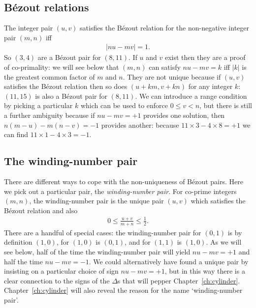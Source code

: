 \subsection{B\'ezout relations}
The integer pair $(u,v)$ satisfies the B\'ezout relation for the non-negative integer pair $(m,n)$ iff
\begin{align}
	|n  u-mv| = 1.
\end{align}
So $(3,4)$ are a B\'ezout pair for $(8,11)$. 
If $u$ and $v$ exist then they are a proof of co-primality: we will see below that $(m,n)$ can satisfy  $ n  u - m v= k$ iff $|k|$ is the greatest common factor of $m$ and $n$. They are not unique because if $(u,v)$ satisfies the B\'ezout relation then so does $(u+km,v+kn)$ for any integer $k$: $(11,15)$ is also a B\'ezout pair for $(8,11)$. We can introduce a range condition by picking a particular $k$ which can be used to enforce $0\leq v< n$, but there is still a further ambiguity because if
$n u- m v  =+1$ provides one solution, then $n(m-u)-m(n-v)=-1$ provides another: because $11\times3-4\times8 =+1$ we can find $11\times 1-4\times 3=-1$. 

\subsection{The winding-number pair}
\label{sec:wnp}
There are different ways to cope with the non-uniqueness of  B\'ezout pairs.
Here we pick out a particular pair, the \textit{winding-number pair}. 
For co-prime integers  $(m,n)$, the winding-number pair is the unique pair  $(u,v)$ which satisfies the B\'ezout relation and also
\begin{align}
	0\leq \frac{u+v}{m+n}\leq \frac{1}{2}. \label{eq:wnpFarey}
\end{align}
There are a handful of special cases: the winding-number pair for  $(0,1)$ is by definition $(1,0)$, for $(1,0)$ is $(0,1)$, and for $(1,1)$ is $(1,0)$. 
As we will see below, half of the time the winding-number pair will yield $nu-mv=+1$ and half the time $n u-m v=-1$. We could alternatively have found a unique pair by insisting on a particular choice of sign $nu-mv=+1$, but in this way there is a clear connection to the signs of the $\Delta$s that will pepper Chapter~\ref{ch:cylinder}. Chapter~\ref{ch:cylinder} will also reveal the reason for the name `winding-number pair'. 


